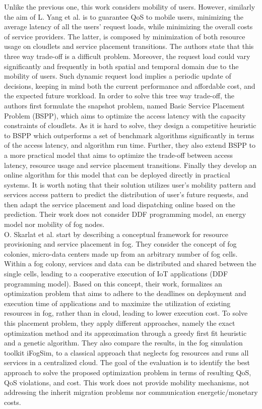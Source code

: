 \noindent\tab Unlike the previous one, this work considers mobility of users. However, similarly the aim of L. Yang et al. \cite{yang2016cost} is to guarantee QoS to mobile users, minimizing the average latency of all the users’ request loads, while minimizing the overall costs of service providers. The latter, is composed by minimization of both resource usage on cloudlets and service placement transitions. The authors state that this three way trade-off is a difficult problem. Moreover, the request load could vary significantly and frequently in both spatial and temporal domain due to the mobility of users. Such dynamic request load implies a periodic update of decisions, keeping in mind both the current performance and affordable cost, and the expected future workload. In order to solve this tree way trade-off, the authors first formulate the snapshot problem, named Basic Service Placement Problem (BSPP), which aims to optimize the access latency with the capacity constraints of cloudlets. As it is hard to solve, they design a competitive heuristic to BSPP which outperforms a set of benchmark algorithms significantly in terms of the access latency, and algorithm run time. Further, they also extend BSPP to a more practical model that aims to optimize the trade-off between access latency, resource usage and service placement transitions. Finally they develop an online algorithm for this model that can be deployed directly in practical systems. It is worth noting that their solution utilizes user’s mobility pattern and services access pattern to predict the distribution of user’s future requests, and then adapt the service placement and load dispatching online based on the prediction. Their work does not consider DDF programming model, an energy model nor mobility of fog nodes.\\
\noindent\tab O. Skarlat et al. \cite{skarlat2017optimized} start by describing a conceptual framework for resource provisioning and service placement in fog. They consider the concept of fog colonies, micro-data centers made up from an arbitrary number of fog cells. Within a fog colony, services and data can be distributed and shared between the single cells, leading to a cooperative execution of IoT applications (DDF programming model). Based on this concept, their work, formalizes an optimization problem that aims to adhere to the deadlines on deployment and execution time of applications and to maximize the utilization of existing resources in fog, rather than in cloud, leading to lower execution cost. To solve this placement problem, they apply different approaches, namely the exact optimization method and its approximation through a greedy first fit heuristic and a genetic algorithm. They also compare the results, in the fog simulation toolkit iFogSim, to a classical approach that neglects fog resources and runs all services in a centralized cloud. The goal of the evaluation is to identify the best approach to solve the proposed optimization problem in terms of resulting QoS, QoS violations, and cost. This work does not provide mobility mechanisms, not addressing the inherit migration problems nor communication energetic/monetary costs. \\
